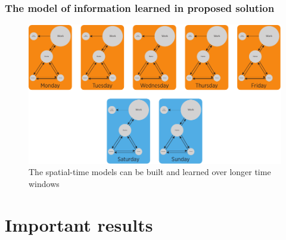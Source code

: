 \documentclass[compress,9pt,xcolor={dvipsnames,table}]{beamer}
\begin{document}
\begin{frame}[t]\frametitle{The model of information learned in proposed solution}
\begin{figure}[tb]
  \centering
  \includegraphics[width=\textwidth]{../../../resources/images/vectors/mobility-graph-larger-time-window-two-rows}
  \caption{The spatial-time models can be built and learned over longer time windows}
  \label{fig:information-learned-longer-time-windows}
\end{figure}
\end{frame}


\section{Important results}
\end{document}

